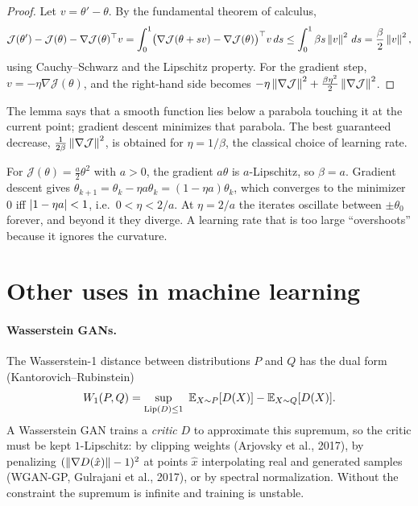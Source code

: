\begin{notechapter}
\begin{proof}
Let $v = \theta'-\theta$. By the fundamental theorem of calculus,
\[
  \mathcal J(\theta') - \mathcal J(\theta) - \nabla\mathcal J(\theta)^\top v
  = \int_0^1\bigl(\nabla\mathcal J(\theta + sv) - \nabla\mathcal J(\theta)\bigr)^\top v\,ds
  \leq\int_0^1\beta s\left\|v\right\|^2\,ds = \frac\beta2\left\|v\right\|^2,
\]
using Cauchy--Schwarz and the Lipschitz property. For the gradient step,
$v = -\eta\nabla\mathcal J(\theta)$, and the right-hand side becomes
$-\eta\left\|\nabla\mathcal J\right\|^2 + \frac{\beta\eta^2}{2}\left\|\nabla\mathcal J\right\|^2$.
\end{proof}

The lemma says that a smooth function lies below a parabola touching it at the
current point; gradient descent minimizes that parabola. The best guaranteed
decrease, $\frac1{2\beta}\left\|\nabla\mathcal J\right\|^2$, is obtained for $\eta = 1/\beta$,
the classical choice of learning rate.

\begin{example}
For $\mathcal J(\theta) = \frac a2\theta^2$ with $a>0$, the gradient $a\theta$ is
$a$-Lipschitz, so $\beta = a$. Gradient descent gives
$\theta_{k+1} = \theta_k - \eta a\theta_k = (1 - \eta a)\theta_k$, which
converges to the minimizer $0$ iff $\left|1-\eta a\right|<1$, i.e.\ $0<\eta<2/a$. At
$\eta = 2/a$ the iterates oscillate between $\pm\theta_0$ forever, and beyond it
they diverge. A learning rate that is too large ``overshoots'' because it
ignores the curvature.
\end{example}

\section{Other uses in machine learning}\label{lipschitz-continuity:sec:other}

\paragraph{Wasserstein GANs.} The Wasserstein-1 distance between distributions
$P$ and $Q$ has the dual form (Kantorovich--Rubinstein)
\[
  W_1(P,Q) = \sup_{\mathrm{Lip}(D)\leq1}\ \mathbb{E}_{X\sim P}[D(X)] - \mathbb{E}_{X\sim Q}[D(X)] .
\]
A Wasserstein GAN trains a \emph{critic} $D$ to approximate this supremum, so
the critic must be kept $1$-Lipschitz: by clipping weights (Arjovsky et al.,
2017), by penalizing $(\left\|\nabla D(\hat x)\right\| - 1)^2$ at points $\hat x$
interpolating real and generated samples (WGAN-GP, Gulrajani et al., 2017), or
by spectral normalization. Without the constraint the supremum is infinite and
training is unstable.


\end{notechapter}
